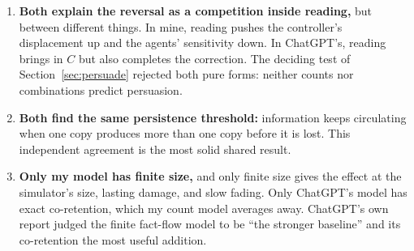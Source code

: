 \documentclass[10pt,a4paper]{article}
\begin{document}
\begin{enumerate}
\item \textbf{Both explain the reversal as a competition inside reading,} but between different things. In mine, reading
  pushes the controller's displacement up and the agents' sensitivity down. In ChatGPT's, reading brings in $C$ but also
  completes the correction. The deciding test of Section~\ref{sec:persuade} rejected both pure forms: neither counts nor
  combinations predict persuasion.
\item \textbf{Both find the same persistence threshold:} information keeps circulating when one copy produces more than
  one copy before it is lost. This independent agreement is the most solid shared result.
\item \textbf{Only my model has finite size,} and only finite size gives the effect at the simulator's size, lasting
  damage, and slow fading. Only ChatGPT's model has exact co-retention, which my count model averages away. ChatGPT's
  own report judged the finite fact-flow model to be ``the stronger baseline'' and its co-retention the most useful
  addition.
\end{enumerate}
\end{document}
